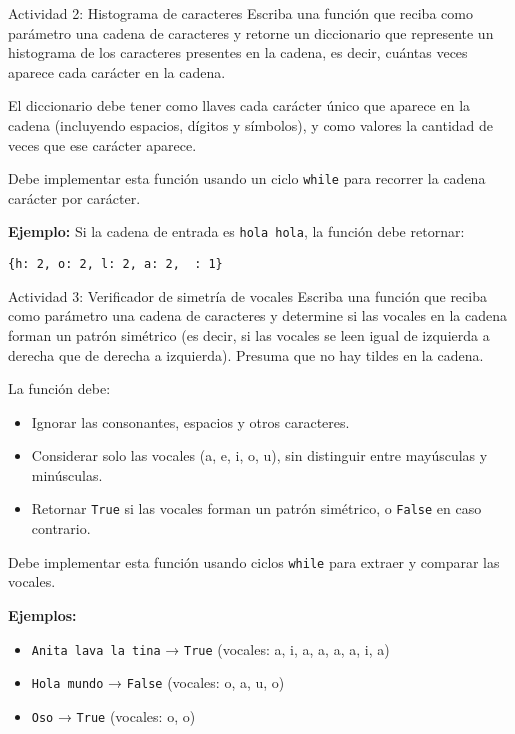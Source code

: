 \documentclass{ip-lab}
\begin{document}
\begin{sectionbox}{Actividad 2: Histograma de caracteres}
Escriba una función que reciba como parámetro una cadena de caracteres y retorne un diccionario que represente un histograma de los caracteres presentes en la cadena, es decir, cuántas veces aparece cada carácter en la cadena.

El diccionario debe tener como llaves cada carácter único que aparece en la cadena (incluyendo espacios, dígitos y símbolos), y como valores la cantidad de veces que ese carácter aparece.

\pagebreak

Debe implementar esta función usando un ciclo \texttt{while} para recorrer la cadena carácter por carácter.

\textbf{Ejemplo:} Si la cadena de entrada es \texttt{\textquotedbl hola hola\textquotedbl}, la función debe retornar:

\texttt{\{\textquotesingle h\textquotesingle: 2, \textquotesingle o\textquotesingle: 2, \textquotesingle l\textquotesingle: 2, \textquotesingle a\textquotesingle: 2, \textquotesingle\ \textquotesingle: 1\}}
\end{sectionbox}


\begin{sectionbox}{Actividad 3: Verificador de simetría de vocales}
Escriba una función que reciba como parámetro una cadena de caracteres y determine si las vocales en la cadena forman un patrón simétrico (es decir, si las vocales se leen igual de izquierda a derecha que de derecha a izquierda). Presuma que no hay tildes en la cadena.

La función debe:
\begin{itemize}
    \item Ignorar las consonantes, espacios y otros caracteres.
    \item Considerar solo las vocales (a, e, i, o, u), sin distinguir entre mayúsculas y minúsculas.
    \item Retornar \texttt{True} si las vocales forman un patrón simétrico, o \texttt{False} en caso contrario.
\end{itemize}

Debe implementar esta función usando ciclos \texttt{while} para extraer y comparar las vocales.

\textbf{Ejemplos:}
\begin{itemize}
    \item \texttt{\textquotedbl Anita lava la tina\textquotedbl} → \texttt{True} (vocales: a, i, a, a, a, a, i, a)
    \item \texttt{\textquotedbl Hola mundo\textquotedbl} → \texttt{False} (vocales: o, a, u, o)
    \item \texttt{\textquotedbl Oso\textquotedbl} → \texttt{True} (vocales: o, o)
\end{itemize}
\end{sectionbox}
\end{document}
